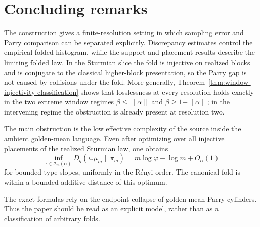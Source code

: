 \section{Concluding remarks}

The construction gives a finite-resolution setting in which sampling error and
Parry comparison can be separated explicitly.  Discrepancy estimates control
the empirical folded histogram, while the support and placement results
describe the limiting folded law.  In the Sturmian slice the fold is injective
on realized blocks and is conjugate to the classical higher-block
presentation, so the Parry gap is not caused by collisions under the fold.
More generally, Theorem~\ref{thm:window-injectivity-classification} shows that
losslessness at every resolution holds exactly in the two extreme window
regimes \(\beta\le\|\alpha\|\) and
\(\beta\ge1-\|\alpha\|\); in the intervening regime the obstruction is
already present at resolution two.

The main obstruction is the low effective complexity of the source inside the
ambient golden-mean language. Even after optimizing over all injective
placements of the realized Sturmian law, one obtains
\[
\inf_{\iota\in\mathcal I_m(\alpha)}D_q(\iota_*\mu_m\|\pi_m)
=
m\log\varphi-\log m+O_\alpha(1)
\]
for bounded-type slopes, uniformly in the R\'enyi order. The canonical fold is
within a bounded additive distance of this optimum.

The exact formulas rely on the endpoint collapse of golden-mean Parry
cylinders.  Thus the paper should be read as an explicit model, rather than as
a classification of arbitrary folds.
